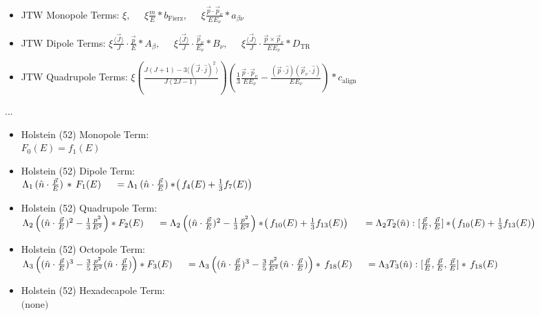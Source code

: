 \begin{itemize}
	\item
JTW Monopole Terms:
$\xi,  \;\;\;\;\;
\xi \frac{m}{E}*b_{\textrm{Fierz}},  \;\;\;\;\;
\xi \frac{\vec{p} \cdot \vec{p}_\nu}{E_{} E_\nu} * a_{\beta\nu} $

	\item
JTW Dipole Terms:
$\xi \frac{\langle \vec{J} \rangle}{J} \cdot \frac{\vec{p}}{E} * A_\beta, \;\;\;\;\;
\xi \frac{\langle \vec{J} \rangle}{J} \cdot \frac{\vec{p}_\nu}{E_\nu} * B_\nu,  \;\;\;\;\;
\xi \frac{\langle \vec{J} \rangle}{J} \cdot \frac{\vec{p} \times \vec{p}_\nu }{E_{} E_\nu} * D_{\mathrm{TR}}$ 

	\item
JTW Quadrupole Terms:
$\xi \left(\!\! \frac{J(J+1) - 3\langle (\vec{J} \cdot \hat{j})^2 \rangle }{J(2J-1)} \!\!\right) \!\!
\left(\!\! \frac{1}{3}\frac{\vec{p}\cdot\vec{p}_\nu}{E_{} E_\nu} - \frac{(\vec{p}\cdot\hat{j})(\vec{p}_\nu \cdot \hat{j})}{E_{} E_\nu} \!\!\right) * c_{\textrm{align}}
$
\end{itemize}

...

\begin{itemize}
	\item
Holstein (52) Monopole Term: \\
$F_0(E) = f_1(E)$
	
	\item
Holstein (52) Dipole Term: \\
$\Lambda_1 \,( \hat{n} \cdot \frac{\vec{p}}{E} )\,* \, F_1(E) \\
\;\;\;\;\; = \Lambda_1 \,( \hat{n} \cdot \frac{\vec{p}}{E} ) * \! \left(\, f_4(E) + \frac{1}{3}f_7(E) \right) $
	
	\item
Holstein (52) Quadrupole Term: \\
$\Lambda_2 \left( (\hat{n}\cdot \frac{\vec{p}}{E})^2 - \frac{1}{3} \frac{p^2}{E^2} \right) * F_2(E) \\ 
\;\;\;\;\; = \Lambda_2 \left( (\hat{n}\cdot \frac{\vec{p}}{E})^2 - \frac{1}{3} \frac{p^2}{E^2} \right)  *\! \left(\, f_{10}(E) + \frac{1}{3} f_{13}(E) \right) \\
\;\;\;\;\; = \Lambda_2 T_2(\hat{n}):[\frac{\vec{p}}{E}, \frac{\vec{p}}{E}] 
  *\! \left(\, f_{10}(E) + \frac{1}{3} f_{13}(E) \right)
$

	\item
Holstein (52) Octopole Term: \\
$\Lambda_3 
\left( (\hat{n} \cdot \frac{\vec{p}}{E} )^3 - \frac{3}{5} \frac{p^2}{E^2} (\hat{n}\cdot \frac{\vec{p}}{E}) \right) 
* F_3(E) \\
\;\;\;\;\; = \Lambda_3
\left( (\hat{n} \cdot \frac{\vec{p}}{E} )^3 - \frac{3}{5} \frac{p^2}{E^2} (\hat{n}\cdot \frac{\vec{p}}{E}) \right) 
* \, f_{18}(E) \\
\;\;\;\;\; = \Lambda_3 T_3(\hat{n}):[\frac{\vec{p}}{E}, \frac{\vec{p}}{E}, \frac{\vec{p}}{E} ] 
* \, f_{18}(E)
$
	\item
Holstein (52) Hexadecapole Term: \\
$\textrm{(none)}$
\end{itemize}

